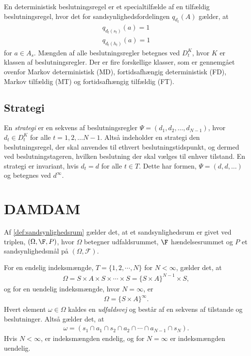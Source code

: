 En deterministisk beslutningsregel er et specialtilfælde af en tilfældig beslutningsregel, hvor det for sandsynlighedsfordelingen $q_{d_t}(A)$ gælder, at
\begin{align*}
    q_{d_t(s_t)}(a)=1\\
    q_{d_t(h_t)}(a)=1
\end{align*}
for $a\in A_s$. Mængden af alle beslutningsregler betegnes ved $D_t^K$, hvor $K$ er klassen af beslutningsregler. Der er fire forskellige klasser, som er gennemgået ovenfor Markov deterministisk (MD), fortidsafhængig deterministisk (FD), Markov tilfældig (MT) og fortidsafhængig tilfældig (FT). 

\subsection{Strategi}
En \textit{strategi} er en sekvens af beslutningsregler $\Psi=(d_1,d_2,\dots,d_{N-1})$, hvor $d_t\in D_t^K$ for alle $t=1, 2, \dots N-1$. Altså indeholder en strategi den beslutningsregel, der skal anvendes til ethvert beslutningstidspunkt, og dermed ved beslutningstageren, hvilken beslutning der skal vælges til enhver tilstand. En strategi er invariant, hvis $d_t=d$ for alle $t\in T$. Dette har formen, $\Psi=(d,d,\dots)$ og betegnes ved $d^\infty$. 




\section{DAMDAM}

Af \autoref{def:sandsynlighedsrum} gælder det, at et sandsynlighedsrum er givet ved triplen, $(\Omega, \F, P)$, hvor $\Omega$ betegner udfaldsrummet, $\F$ hændelsesrummet og $P$ et sandsynlighedsmål på $(\Omega,\mathcal{F})$.

For en endelig indeksmængde, $T=\{1, 2,\cdots, N\}$ for $N<\infty$, gælder det, at
\begin{align*}
    \Omega = S \times A \times S \times \cdots \times S = \{S \times A\}^{N-1} \times S,
\end{align*}
og for en uendelig indeksmængde, hvor $N=\infty$, er 
\begin{align*}
    \Omega = \{S \times A\}^\infty.
\end{align*}
Hvert element $\omega \in \Omega$ kaldes en \textit{udfaldsvej} og består af en sekvens af tilstande og beslutninger. Altså gælder det, at
\begin{align*}
    \omega=(s_1 \cap a_1 \cap s_2 \cap a_2 \cap \cdots \cap a_{N-1} \cap s_N).
\end{align*}
Hvis $N<\infty$, er indeksmængden endelig, og for $N=\infty$ er indeksmængden uendelig. 

